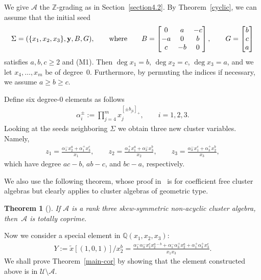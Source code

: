 \documentclass[11pt]{article}
\numberwithin{equation}{section}
\newtheorem{Theorem}{Theorem}[section]
\begin{document}
We give $\mathcal{A}$ the $\mathbb{Z}$-grading as in Section~\ref{section4.2}. By Theorem~\ref{cyclic}, we can assume that the initial seed
\begin{gather*}
\Sigma=(\{x_1,x_2,x_3\},{\bf y},B,G),\qquad\textrm{where} \qquad B= \left[ \begin{matrix}
0 & a &-c \\
-a & 0 & b \\
c& -b & 0
\end{matrix}  \right], \qquad G=\left[ \begin{matrix}
b \\ c \\ a  \end{matrix} \right]
\end{gather*}
satisf\/ies $a,b,c\ge2$ and (M1). Then $\deg x_{1}=b$, $\deg x_{2}=c$, $\deg x_{3}=a$, and we let $x_{4},\dots,x_{m}$ be of degree~0.  Furthermore, by permuting the indices if necessary, we assume
$a\ge b\ge c$.


Def\/ine six degree-0 elements as follows
\begin{gather*}
\alpha_i^\pm := \prod_{j=4}^m x_j^{[\pm b_{ji}]_+}, \qquad i=1,2,3.
\end{gather*}
Looking at the seeds neighboring $\Sigma$ we obtain three new cluster variables. Namely,
\begin{gather*}
z_1=\frac{\alpha_1^-x_2^a+\alpha_1^+x_3^c}{x_1},
\qquad z_2=\frac{\alpha_2^+x_1^a+\alpha_2^-x_3^b}{x_2}, \qquad z_3=\frac{\alpha_3^-x_1^c+\alpha_3^+x_2^b}{x_3},
 \end{gather*} which have degree $ac-b$, $ab-c$, and $bc-a$, respectively.

We also use the following theorem, whose proof in~\cite{MM} is for coef\/f\/icient free cluster algebras but clearly applies to cluster algebras of geometric type.
\begin{Theorem}[]
\label{coprime}
If $\mathcal{A}$ is a rank three skew-symmetric non-acyclic cluster algebra, then~$\mathcal{A}$ is totally coprime.
\end{Theorem}

Now we consider a special element in $\mathbb{Q}(x_1,x_2,x_3)$:
\begin{gather*}
Y:=\tilde{x}[(1,0,1)]/x_2^b =\frac{\alpha_1^-\alpha_3^-x_1^cx_2^{a-b}+\alpha_1^-\alpha_3^+x_2^a+\alpha_1^+\alpha_3^+x_3^c}{x_1x_3}.
\end{gather*}
We shall prove Theorem~\ref{main-cor} by showing that the element constructed above is in $\mathcal{U}\setminus\mathcal{A}$.
\end{document}
